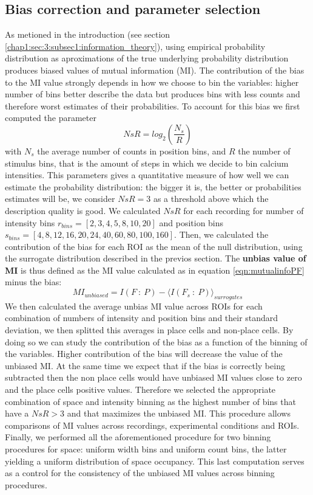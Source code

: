 \subsection{Bias correction and parameter selection}
As metioned in the introduction (see section \ref{chap1:sec:3:subsec1:information_theory}), using empirical probability distribution as aproximations of the true underlying probability distribution produces biased values of mutual information (MI). 
The contribution of the bias to the MI value strongly depends in how we choose to bin the variables: higher number of bins better describe the data but produces bins with less counts and therefore worst estimates of their probabilities. 
To account for this bias we first computed the parameter 
\begin{equation}
    NsR = log_2(\frac{N_s}{R})
\end{equation}
with $N_s$ the average number of counts in position bins, and $R$ the number of stimulus bins, that is the amount of steps in which we decide to bin calcium intensities.
This parameters gives a quantitative measure of how well we can estimate the probability distribution: the bigger it is, the better or probabilities estimates will be, we consider $NsR=3$ as a threshold above which the description quality is good.
We calculated $NsR$ for each recording for number of intensity bins $r_{bins} = [2,3,4,5,8,10,20]$ and position bins $s_{bins} = [4,8,12,16,20,24,40,60,80,100,160]$.
Then, we calculated the contribution of the bias for each ROI as the mean of the null distribution, using the surrogate distribution described in the previos section. 
The \textbf{unbias value of MI} is thus defined as the MI value calculated as in equation \ref{eqn:mutualinfoPF} minus the bias:
\begin{equation}
    \label{eqn:unbias_mutualinfo}
    MI_{unbiased}=I(F\ :\ P) - \langle I(F_{s}\ :\ P)\rangle_{surrogates}
\end{equation}
We then calculated the average unbias MI value across ROIs for each combination of numbers of intensity and position bins and their standard deviation, we then splitted this averages in place cells and non-place cells. 
By doing so we can study the contribution of the bias as a function of the binning of the variables.
Higher contribution of the bias will decrease the value of the unbiased MI.
At the same time we expect that if the bias is correctly being subtracted then the non place cells would have unbiased MI values close to zero and the place cells positive values. 
Therefore we selected the appropriate combination of space and intensity binning as the highest number of bins that have a $NsR>3$ and that maximizes the unbiased MI. 
This procedure allows comparisons of MI values across recordings, experimental conditions and ROIs. 
Finally, we performed all the aforementioned procedure for two binning procedures for space: uniform width bins and uniform count bins, the latter yielding a uniform distribution of space occupancy.
This last computation serves as a control for the consistency of the unbiased MI values across binning procedures. 
